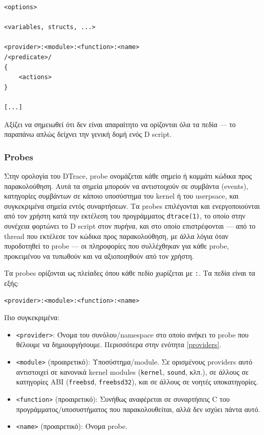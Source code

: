 \documentclass[12pt]{article}
\begin{document}
\begin{lstlisting}
<options>

<variables, structs, ...>

<provider>:<module>:<function>:<name>
/<predicate>/
{
	<actions>
}

[...]
\end{lstlisting}

Αξίζει να σημειωθεί ότι δεν είναι απαραίτητο να ορίζονται όλα τα πεδία --- το
παραπάνω απλώς δείχνει την γενική δομή ενός D script.

\subsubsection{Probes}

Στην ορολογία του DTrace, probe ονομάζεται κάθε σημείο ή κομμάτι κώδικα προς
παρακολούθηση. Αυτά τα σημεία μπορούν να αντιστοιχούν σε συμβάντα (events),
κατηγορίες συμβάντων σε κάποιο υποσύστημα του kernel ή του userpsace, και
συγκεκριμένα σημεία εντός συναρτήσεων. Τα probes επιλέγονται και
ενεργοποιούνται από τον χρήστη κατά την εκτέλεση του προγράμματος
\lstinline{dtrace(1)}, το οποίο στην συνέχεια φορτώνει το D script στον πυρήνα,
και στο οποίο επιστρέφονται --- από το thread που εκτέλεσε τον κώδικα προς
παρακολούθηση, με άλλα λόγια όταν πυροδοτηθεί το probe --- οι πληροφορίες που
συλλέχθηκαν για κάθε probe, προκειμένου να τυπωθούν και να αξιοποιηθούν από τον
χρήστη.

Τα probes ορίζονται ως πλείαδες όπου κάθε πεδίο χωρίζεται με \lstinline{:}. Τα
πεδία είναι τα εξής:

\begin{lstlisting}
<provider>:<module>:<function>:<name>
\end{lstlisting}

Πιο συγκεκριμένα:

\begin{itemize}
	\item \lstinline{<provider>}: Όνομα του συνόλου/namespace στο οποίο
		ανήκει το probe που θέλουμε να δημιουργήσουμε. Περισσότερα στην
		ενότητα \ref{providers}.
	\item \lstinline{<module>} (προαιρετικό): Υποσύστημα/module. Σε ορισμένους
		providers αυτό αντιστοιχεί σε κανονικά kernel modules
		(\lstinline{kernel}, \lstinline{sound}, κλπ.), σε άλλους σε
		κατηγορίες ABI (\lstinline{freebsd}, \lstinline{freebsd32}),
		και σε άλλους σε νοητές υποκατηγορίες.
	\item \lstinline{<function>} (προαιρετικό): Συνήθως αναφέρεται σε
		συναρτήσεις C του προγράμματος/υποσυστήματος που
		παρακολουθείται, αλλά δεν ισχύει πάντα αυτό.
	\item \lstinline{<name>} (προαιρετικό): Όνομα probe.
\end{itemize}
\end{document}
